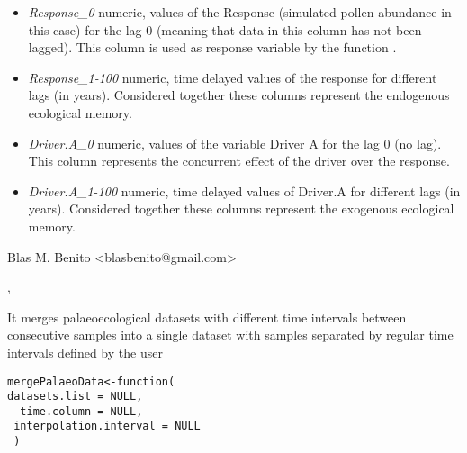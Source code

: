 \documentclass[letterpaper]{book}
\begin{document}
%
\begin{Details}\relax
\begin{itemize}

\item \emph{Response\_0} numeric, values of the Response (simulated pollen abundance in this case) for the lag 0 (meaning that data in this column has not been lagged). This column is used as response variable by the function .
\item \emph{Response\_1-100} numeric, time delayed values of the response for different lags (in years). Considered together these columns represent the endogenous ecological memory.
\item \emph{Driver.A\_0} numeric, values of the variable Driver A for the lag 0 (no lag). This column represents the concurrent effect of the driver over the response.
\item \emph{Driver.A\_1-100} numeric, time delayed values of Driver.A for different lags (in years). Considered together these columns represent the exogenous ecological memory.

\end{itemize}

\end{Details}
%
\begin{Author}\relax
Blas M. Benito  <blasbenito@gmail.com>
\end{Author}
%
\begin{SeeAlso}\relax
{}, 
\end{SeeAlso}
%
\begin{Description}\relax
It merges palaeoecological datasets with different time intervals between consecutive samples into a single dataset with samples separated by regular time intervals defined by the user
\end{Description}
%
\begin{Usage}
\begin{verbatim}
mergePalaeoData<-function(
datasets.list = NULL,
  time.column = NULL,
 interpolation.interval = NULL
 )
\end{verbatim}
\end{Usage}
%
\end{document}
